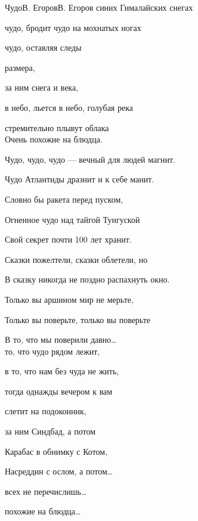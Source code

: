 \documentclass[11pt,a5paper]{book}
\renewcommand{\tt}{\indent \indent}
\begin{document}
\begin{song}{Чудо}{}{В. Егоров}{В. Егоров}{}{}
 синих Гималайских снегах \par
{} чудо, бродит чудо на мохнатых ногах \par
{} чудо, оставляя следы \par
{} размера,\par
{} за ним снега и века,\par
{} в небо, льется в небо, голубая река \par
{} стремительно плывут облака \\

Очень похожие на блюдца.\par
Чудо, чудо, чудо — вечный для людей магнит.\par
Чудо Атлантиды дразнит и к себе манит.\par
Словно бы ракета перед пуском,\par
Огненное чудо над тайгой Тунгуской \par
Свой секрет почти 100 лет хранит.\par
Сказки пожелтели, сказки облетели, но \par
В сказку никогда не поздно распахнуть окно.\par
Только вы аршином мир не мерьте,\par
Только вы поверьте, только вы поверьте \par
В то, что мы поверили давно…\\

 то, что чудо рядом лежит,\par
{} в то, что нам без чуда не жить,\par
{} тогда однажды вечером к вам \par
{} слетит на подоконник,\par
{} за ним Синдбад, а потом \par
{} Карабас в обнимку с Котом,\par
{} Насреддин с ослом, а потом…\par
{} всех не перечислишь…\par
{} похожие на блюдца…\\
\end{song}
\end{document}
